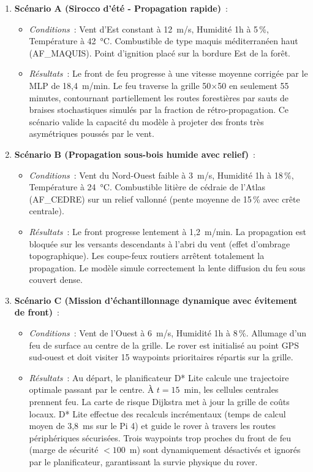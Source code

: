 \begin{enumerate}
    \item \textbf{Scénario A (Sirocco d'été - Propagation rapide)}~: 
        \begin{itemize}[nosep]
            \item \textit{Conditions}~: Vent d'Est constant à 12~m/s, Humidité 1h à 5\,\%, Température à 42~°C. Combustible de type maquis méditerranéen haut (AF\_MAQUIS). Point d'ignition placé sur la bordure Est de la forêt.
            \item \textit{Résultats}~: Le front de feu progresse à une vitesse moyenne corrigée par le MLP de 18{,}4~m/min. Le feu traverse la grille 50$\times$50 en seulement 55 minutes, contournant partiellement les routes forestières par sauts de braises stochastiques simulés par la fraction de rétro-propagation. Ce scénario valide la capacité du modèle à projeter des fronts très asymétriques poussés par le vent.
        \end{itemize}
    \item \textbf{Scénario B (Propagation sous-bois humide avec relief)}~: 
        \begin{itemize}[nosep]
            \item \textit{Conditions}~: Vent du Nord-Ouest faible à 3~m/s, Humidité 1h à 18\,\%, Température à 24~°C. Combustible litière de cédraie de l'Atlas (AF\_CEDRE) sur un relief vallonné (pente moyenne de 15\,\% avec crête centrale).
            \item \textit{Résultats}~: Le front progresse lentement à 1{,}2~m/min. La propagation est bloquée sur les versants descendants à l'abri du vent (effet d'ombrage topographique). Les coupe-feux routiers arrêtent totalement la propagation. Le modèle simule correctement la lente diffusion du feu sous couvert dense.
        \end{itemize}
    \item \textbf{Scénario C (Mission d'échantillonnage dynamique avec évitement de front)}~: 
        \begin{itemize}[nosep]
            \item \textit{Conditions}~: Vent de l'Ouest à 6~m/s, Humidité 1h à 8\,\%. Allumage d'un feu de surface au centre de la grille. Le rover est initialisé au point GPS sud-ouest et doit visiter 15 waypoints prioritaires répartis sur la grille.
            \item \textit{Résultats}~: Au départ, le planificateur D* Lite calcule une trajectoire optimale passant par le centre. À $t = 15$~min, les cellules centrales prennent feu. La carte de risque Dijkstra met à jour la grille de coûts locaux. D* Lite effectue des recalculs incrémentaux (temps de calcul moyen de 3{,}8~ms sur le Pi 4) et guide le rover à travers les routes périphériques sécurisées. Trois waypoints trop proches du front de feu (marge de sécurité $< 100$~m) sont dynamiquement désactivés et ignorés par le planificateur, garantissant la survie physique du rover.
        \end{itemize}
\end{enumerate}

